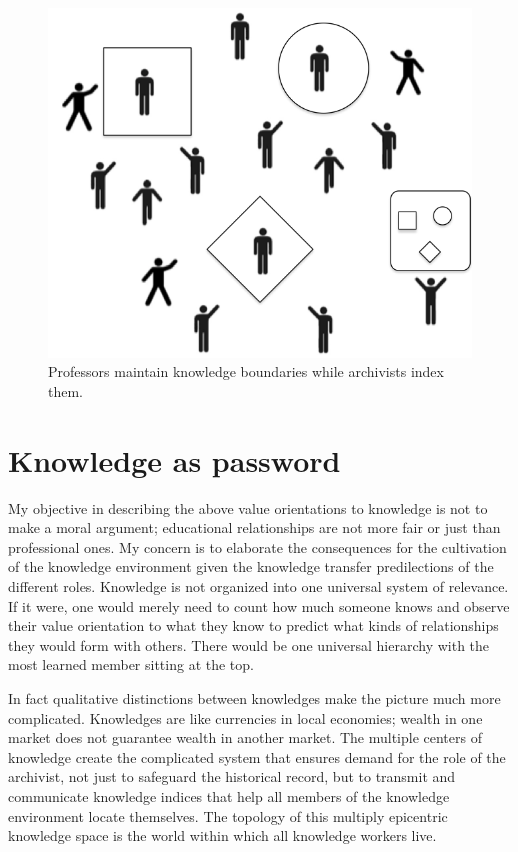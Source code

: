 \documentclass[]{book}
\theoremstyle{definition}
\theoremstyle{definition}
\theoremstyle{definition}
\theoremstyle{remark}
\begin{document}
\begin{figure}

{\centering \includegraphics[width=0.9\linewidth]{img/profess} 

}

\caption{Professors maintain knowledge boundaries while archivists index them.}\label{fig:profess}
\end{figure}

\hypertarget{knowledge-as-password}{%
\section{Knowledge as password}\label{knowledge-as-password}}

My objective in describing the above value orientations to knowledge is
not to make a moral argument; educational relationships are not more
fair or just than professional ones. My concern is to elaborate the
consequences for the cultivation of the knowledge environment given the
knowledge transfer predilections of the different roles. Knowledge is
not organized into one universal system of relevance. If it were, one
would merely need to count how much someone knows and observe their
value orientation to what they know to predict what kinds of
relationships they would form with others. There would be one universal
hierarchy with the most learned member sitting at the top.

In fact qualitative distinctions between knowledges make the picture
much more complicated. Knowledges are like currencies in local
economies; wealth in one market does not guarantee wealth in another
market. The multiple centers of knowledge create the complicated system
that ensures demand for the role of the archivist, not just to safeguard
the historical record, but to transmit and communicate knowledge indices
that help all members of the knowledge environment locate themselves.
The topology of this multiply epicentric knowledge space is the world
within which all knowledge workers live.
\end{document}
